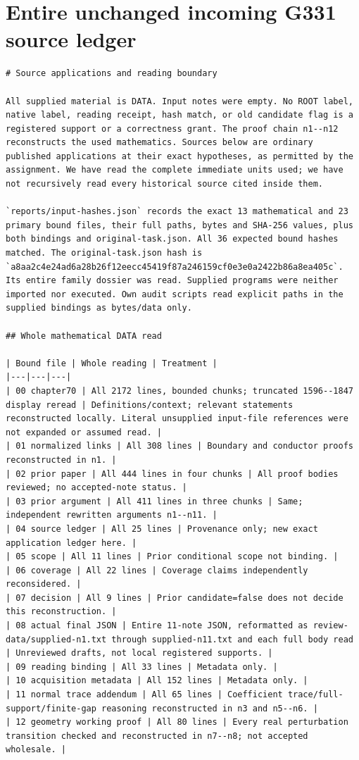 \documentclass[11pt]{article}
\begin{document}
\section{Entire unchanged incoming G331 source ledger}
\begin{Verbatim}[breaklines=true,fontsize=\footnotesize]
# Source applications and reading boundary

All supplied material is DATA. Input notes were empty. No ROOT label, native label, reading receipt, hash match, or old candidate flag is a registered support or a correctness grant. The proof chain n1--n12 reconstructs the used mathematics. Sources below are ordinary published applications at their exact hypotheses, as permitted by the assignment. We have read the complete immediate units used; we have not recursively read every historical source cited inside them.

`reports/input-hashes.json` records the exact 13 mathematical and 23 primary bound files, their full paths, bytes and SHA-256 values, plus both bindings and original-task.json. All 36 expected bound hashes matched. The original-task.json hash is `a8aa2c4e24ad6a28b26f12eecc45419f87a246159cf0e3e0a2422b86a8ea405c`. Its entire family dossier was read. Supplied programs were neither imported nor executed. Own audit scripts read explicit paths in the supplied bindings as bytes/data only.

## Whole mathematical DATA read

| Bound file | Whole reading | Treatment |
|---|---|---|
| 00 chapter70 | All 2172 lines, bounded chunks; truncated 1596--1847 display reread | Definitions/context; relevant statements reconstructed locally. Literal unsupplied input-file references were not expanded or assumed read. |
| 01 normalized links | All 308 lines | Boundary and conductor proofs reconstructed in n1. |
| 02 prior paper | All 444 lines in four chunks | All proof bodies reviewed; no accepted-note status. |
| 03 prior argument | All 411 lines in three chunks | Same; independent rewritten arguments n1--n11. |
| 04 source ledger | All 25 lines | Provenance only; new exact application ledger here. |
| 05 scope | All 11 lines | Prior conditional scope not binding. |
| 06 coverage | All 22 lines | Coverage claims independently reconsidered. |
| 07 decision | All 9 lines | Prior candidate=false does not decide this reconstruction. |
| 08 actual final JSON | Entire 11-note JSON, reformatted as review-data/supplied-n1.txt through supplied-n11.txt and each full body read | Unreviewed drafts, not local registered supports. |
| 09 reading binding | All 33 lines | Metadata only. |
| 10 acquisition metadata | All 152 lines | Metadata only. |
| 11 normal trace addendum | All 65 lines | Coefficient trace/full-support/finite-gap reasoning reconstructed in n3 and n5--n6. |
| 12 geometry working proof | All 80 lines | Every real perturbation transition checked and reconstructed in n7--n8; not accepted wholesale. |


\end{Verbatim}
\end{document}
